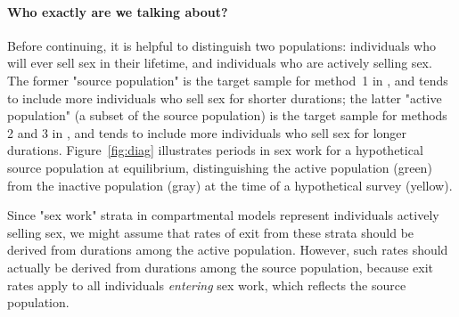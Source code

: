 \paragraph{Who exactly are we talking about?}
Before continuing, it is helpful to distinguish two populations:
individuals who will ever sell sex in their lifetime, and
individuals who are actively selling sex.
The former "source population"
is the target sample for method~1 in \citep{Fazito2012},
and tends to include more individuals who sell sex for shorter durations;
the latter "active population"
(a subset of the source population)
is the target sample for methods 2 and 3 in \citep{Fazito2012},
and tends to include more individuals who sell sex for longer durations.
Figure~\ref{fig:diag} illustrates periods in sex work
for a hypothetical source population at equilibrium, distinguishing
the active population (green) from the inactive population (gray)
at the time of a hypothetical survey (yellow).
\par
Since "sex work" strata in compartmental models
represent individuals actively selling sex,
we might assume that rates of exit from these strata should be derived from
durations among the active population.
However, such rates should actually be derived from
durations among the source population,
because exit rates apply to all individuals \emph{entering} sex work,
which reflects the source population.

